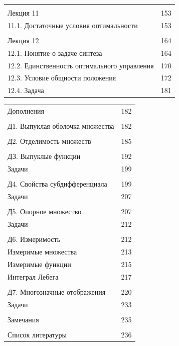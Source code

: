 \documentclass[8pt]{extarticle}
\begin{document}
\begin{tabularx}{\textwidth}{@{}Xr@{}}
& \\
Лекция 11 & 153 \\
\hspace*{1em}11.1. Достаточные условия оптимальности & 153 \\
& \\
Лекция 12 & 164 \\
\hspace*{1em}12.1. Понятие о задаче синтеза & 164 \\
\hspace*{1em}12.2. Единственность оптимального управления & 170 \\
\hspace*{1em}12.3. Условие общности положения & 172 \\
\hspace*{1em}12.4. Задача & 181 \\
\end{tabularx}

\clearpage

\begin{tabularx}{\textwidth}{@{}Xr@{}}
Дополнения & 182 \\
& \\
Д1. Выпуклая оболочка множества & 182 \\
& \\
Д2. Отделимость множеств & 185 \\
& \\
ДЗ. Выпуклые функции & 192 \\
\hspace*{1em}Задачи & 199 \\
& \\
Д4. Свойства субдифференциала & 199 \\
\hspace*{1em}Задачи & 207 \\
& \\
Д5. Опорное множество & 207 \\
\hspace*{1em}Задачи & 212 \\
& \\
Д6. Измеримость & 212 \\
\hspace*{1em}Измеримые множества & 213 \\
\hspace*{1em}Измеримые функции & 215 \\
\hspace*{1em}Интеграл Лебега & 217 \\
& \\
Д7. Многозначные отображения & 220 \\
\hspace*{1em}Задачи & 233 \\
& \\
Замечания & 235 \\
& \\
Список литературы & 236 \\
\end{tabularx}
\end{document}

